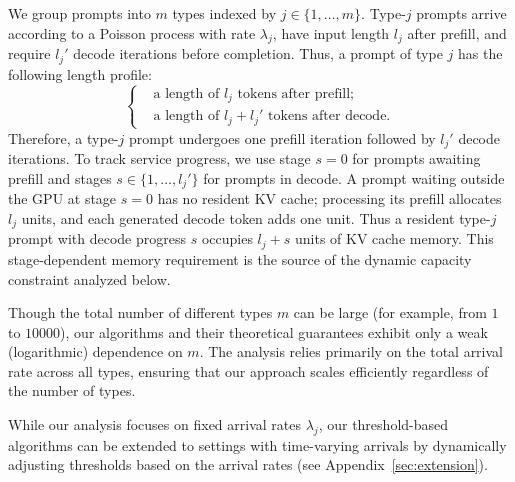 We group prompts into \( m \) types indexed by \( j \in \{1, \dots, m\} \). Type-\(j\) prompts arrive according to a Poisson process with rate \( \lambda_j \), have input length \(l_j\) after prefill, and require \(l_j'\) decode iterations before completion.
Thus, a prompt of type \( j \) has the following length profile:
\begin{equation*}
    \left\{
    \begin{aligned}
        &\text{a length of } l_j \text{ tokens after prefill;}\\
        &\text{a length of } l_j + l_j' \text{ tokens after decode.}
    \end{aligned}
    \right.
\end{equation*}
Therefore, a type-$j$ prompt undergoes one prefill iteration followed by \(l_j'\) decode iterations. To track service progress, we use stage \(s=0\) for prompts awaiting prefill and stages \(s \in \{1, \dots, l_j'\}\) for prompts in decode. A prompt waiting outside the GPU at stage \(s=0\) has no resident KV cache; processing its prefill allocates \(l_j\) units, and each generated decode token adds one unit. Thus a resident type-$j$ prompt with decode progress \(s\) occupies \(l_j+s\) units of KV cache memory. This stage-dependent memory requirement is the source of the dynamic capacity constraint analyzed below.

Though the total number of different types $m$ can be large (for example, from $1$ to $10000$), our algorithms and their theoretical guarantees exhibit only a weak (logarithmic) dependence on $m$. The analysis relies primarily on the total arrival rate across all types, ensuring that our approach scales efficiently regardless of the number of types.

While our analysis focuses on fixed arrival rates $\lambda_j$, our threshold-based algorithms can be extended to settings with time-varying arrivals by dynamically adjusting thresholds based on the arrival rates (see Appendix~\ref{sec:extension}).



